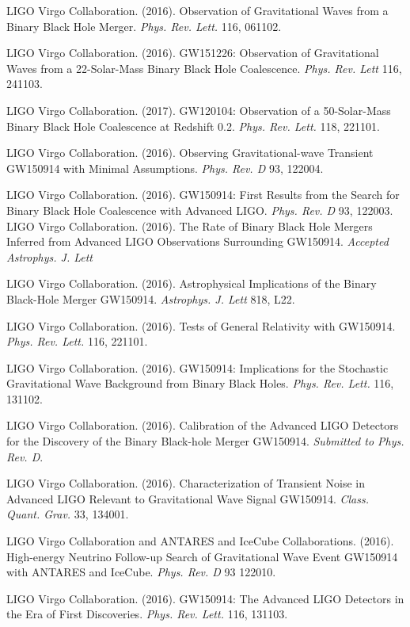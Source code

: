 LIGO Virgo Collaboration. (2016). Observation of Gravitational Waves from a Binary Black Hole Merger. {\em Phys. Rev. Lett.} 116, 061102.

LIGO Virgo Collaboration. (2016). GW151226: Observation of Gravitational Waves from a 22-Solar-Mass Binary Black Hole Coalescence. {\em Phys. Rev. Lett} 116, 241103.
  
  LIGO Virgo Collaboration. (2017). GW120104: Observation of a 50-Solar-Mass Binary Black Hole Coalescence at Redshift 0.2. {\em Phys. Rev. Lett.} 118, 221101.

  LIGO Virgo Collaboration. (2016). Observing Gravitational-wave Transient GW150914 with Minimal Assumptions. {\em Phys. Rev. D} 93, 122004.

  LIGO Virgo Collaboration. (2016). GW150914: First Results from the Search for Binary Black Hole Coalescence with Advanced LIGO. {\em Phys. Rev. D} 93, 122003.
  LIGO Virgo Collaboration. (2016). The Rate of Binary Black Hole Mergers Inferred from Advanced LIGO Observations Surrounding GW150914. {\em Accepted Astrophys. J. Lett}

  LIGO Virgo Collaboration. (2016). Astrophysical Implications of the Binary Black-Hole Merger GW150914. {\em Astrophys. J. Lett} 818, L22.

  LIGO Virgo Collaboration. (2016). Tests of General Relativity with GW150914. {\em Phys. Rev. Lett.} 116, 221101.
  
  LIGO Virgo Collaboration. (2016). GW150914: Implications for the Stochastic Gravitational Wave Background from Binary Black Holes. {\em Phys. Rev. Lett.} 116, 131102.

  LIGO Virgo Collaboration. (2016). Calibration of the Advanced LIGO Detectors for the Discovery of the Binary Black-hole Merger GW150914. {\em Submitted to Phys. Rev. D}.

  LIGO Virgo Collaboration. (2016). Characterization of Transient Noise in Advanced LIGO Relevant to Gravitational Wave Signal GW150914. {\em Class. Quant. Grav.} 33, 134001.

  LIGO Virgo Collaboration and ANTARES and IceCube Collaborations. (2016). High-energy Neutrino Follow-up Search of Gravitational Wave Event GW150914 with ANTARES and IceCube. {\em Phys. Rev. D} 93 122010. 

  LIGO Virgo Collaboration. (2016). GW150914: The Advanced LIGO Detectors in the Era of First Discoveries. {\em Phys. Rev. Lett.} 116, 131103.

